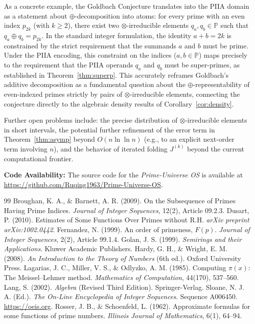 \documentclass[11pt, a4paper]{article}
\begin{document}
As a concrete example, the Goldbach Conjecture translates into the PIIA domain as a statement about $\oplus$-decomposition into atoms: for every prime with an even index $p_{2k}$ (with $k \ge 2$), there exist two $\otimes$-irreducible elements $q_a, q_b \in \mathbb{P}$ such that $q_a \oplus q_b = p_{2k}$. In the standard integer formulation, the identity $a + b = 2k$ is constrained by the strict requirement that the summands $a$ and $b$ must be prime. Under the PIIA encoding, this constraint on the indices ($a, b \in \mathbb{P}$) maps precisely to the requirement that the PIIA operands $q_a$ and $q_b$ must be super-primes, as established in Theorem~\ref{thm:superp}. This accurately reframes Goldbach's additive decomposition as a fundamental question about the $\oplus$-representability of even-indexed primes strictly by pairs of $\otimes$-irreducible elements, connecting the conjecture directly to the algebraic density results of Corollary~\ref{cor:density}.

Further open problems include: the precise distribution of $\otimes$-irreducible elements in short intervals, the potential further refinement of the error term in Theorem~\ref{thm:asymp} beyond $O(n \ln \ln n)$ (e.g., to an explicit next-order term involving $n$), and the behavior of iterated folding $J^{(k)}$ beyond the current computational frontier.

\vspace{0.5cm}
\noindent \textbf{Code Availability:} The source code for the \textit{Prime-Universe OS} is available at \url{https://github.com/Ruqing1963/Prime-Universe-OS}.

\begin{thebibliography}{99}
 Broughan, K. A., \& Barnett, A. R. (2009). On the Subsequence of Primes Having Prime Indices. \textit{Journal of Integer Sequences}, 12(2), Article 09.2.3.
 Dusart, P. (2010). Estimates of Some Functions Over Primes without R.H. \textit{arXiv preprint arXiv:1002.0442}.
 Fernandez, N. (1999). An order of primeness, $F(p)$. \textit{Journal of Integer Sequences}, 2(2), Article 99.1.4.
 Golan, J. S. (1999). \textit{Semirings and their Applications}. Kluwer Academic Publishers.
 Hardy, G. H., \& Wright, E. M. (2008). \textit{An Introduction to the Theory of Numbers} (6th ed.). Oxford University Press.
 Lagarias, J. C., Miller, V. S., \& Odlyzko, A. M. (1985). Computing $\pi(x)$: The Meissel--Lehmer method. \textit{Mathematics of Computation}, 44(170), 537--560.
 Lang, S. (2002). \textit{Algebra} (Revised Third Edition). Springer-Verlag.
 Sloane, N. J. A. (Ed.). \textit{The On-Line Encyclopedia of Integer Sequences}. Sequence A006450. \url{https://oeis.org}.
 Rosser, J. B., \& Schoenfeld, L. (1962). Approximate formulas for some functions of prime numbers. \textit{Illinois Journal of Mathematics}, 6(1), 64--94.
\end{thebibliography}
\end{document}
